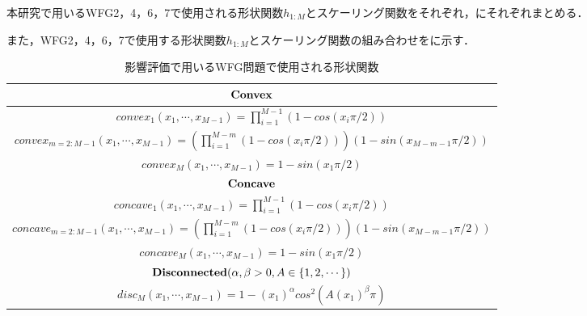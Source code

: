 \documentclass[../main/main]{subfiles}
\begin{document}
本研究で用いるWFG2，4，6，7で使用される形状関数$h_{1:M}$とスケーリング関数をそれぞれ，にそれぞれまとめる．

また，WFG2，4，6，7で使用する形状関数$h_{1:M}$とスケーリング関数の組み合わせをに示す．



\begin{table}[htbp]
\fontsize{9.5pt}{9.5pt} \selectfont
\centering
\caption{影響評価で用いるWFG問題で使用される形状関数}
\vspace{0.1cm}
\label{wfg_shape}
\begin{tabular}{|c|}
\hline 
$\bf{Convex}$\\
\hline
$convex_1(x_1, \cdots, x_{M-1}) = \prod^{M-1}_{i=1} (1 - cos(x_i \pi / 2 )) $\\
$convex_{m=2:M-1}(x_1, \cdots, x_{M-1}) =\left( \prod^{M-m}_{i=1} (1 - cos(x_i \pi / 2 )) \right) ( 1 - sin(x_{M-m-1} \pi / 2 ) )$\\
$convex_M(x_1, \cdots, x_{M-1}) = 1 - sin( x_1 \pi / 2 )$\\
\hline
\hline
$\bf{Concave}$\\
\hline
$concave_1(x_1, \cdots, x_{M-1}) = \prod^{M-1}_{i=1} (1 - cos(x_i \pi / 2 )) $\\
$concave_{m=2:M-1}(x_1, \cdots, x_{M-1}) =\left( \prod^{M-m}_{i=1} (1 - cos(x_i \pi / 2 )) \right) ( 1 - sin(x_{M-m-1} \pi / 2 ) )$\\
$concave_M(x_1, \cdots, x_{M-1}) = 1 - sin( x_1 \pi / 2 )$\\
\hline
\hline
${\bf Disconnected} (\alpha, \beta > 0, A \in \{1, 2, \cdots \}) $\\
\hline
$disc_M (x_1, \cdots, x_{M-1}) = 1 - (x_1)^\alpha cos^2 (A(x_1)^\beta \pi)$\\
\hline
\end{tabular}
\end{table}
\end{document}

